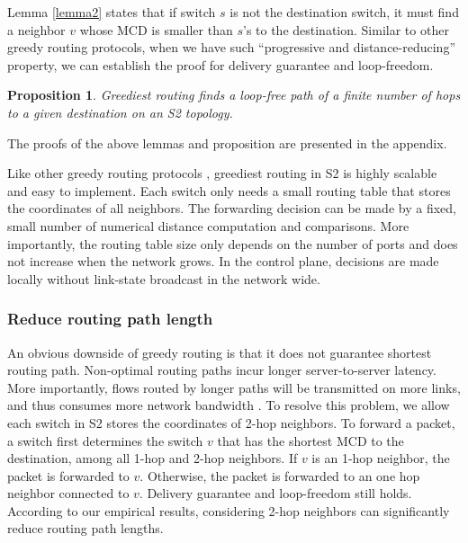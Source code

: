 \documentclass[10pt,conference]{IEEEtran}
\newtheorem{theorem}{Proposition}
\begin{document}
Lemma \ref{lemma2} states that if switch $s$ is not the destination switch, it must find a neighbor $v$ whose MCD is smaller than $s$'s to the destination. Similar to other greedy routing protocols, when we have such ``progressive and distance-reducing'' property, we can establish the proof for delivery guarantee and loop-freedom.
\begin{theorem}
\label{thm:delivery_greediest}
Greediest routing  finds a loop-free path of a finite number of hops to a given destination on an S2 topology.
\end{theorem}

The proofs of the above lemmas and proposition are presented in the appendix.

Like other greedy routing protocols \cite{SWDC, ROME}, greediest routing in S2 is highly scalable and easy to implement. Each switch only needs a small routing table that stores the coordinates of all neighbors. The forwarding decision can be made by a fixed, small number of numerical distance computation and comparisons. More importantly, the routing table size only depends on the number of ports and does not increase when the network grows. In the control plane, decisions are made locally without link-state broadcast in the network wide.



\subsubsection{Reduce routing path length}
An obvious downside of greedy routing is that it does not guarantee shortest routing path.
Non-optimal routing paths incur longer server-to-server latency.
More importantly, flows routed by longer paths will be transmitted on more links, and thus consumes more network bandwidth \cite{Jellyfish}.
To resolve this problem, we allow each switch in S2 stores the coordinates of 2-hop neighbors.
To forward a packet, a switch first determines the  switch $v$ that has the shortest MCD to the destination, among all 1-hop and 2-hop neighbors.
If $v$ is an 1-hop neighbor, the packet is forwarded to $v$.
Otherwise, the packet is forwarded to an one hop neighbor connected to $v$.
Delivery guarantee and loop-freedom still holds.
According to our empirical results, considering 2-hop neighbors can significantly reduce routing path lengths.
\end{document}
